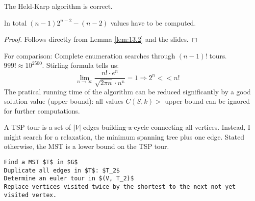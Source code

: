 \begin{thm}
The Held-Karp algorithm is correct.

In total $(n-1) 2^{n-2} - (n-2)$ values have to be computed.
\end{thm}
\begin{proof}
Follows directly from Lemma \ref{lem:13.2} and the slides.
\end{proof}

For comparison: Complete enumeration searches through $(n-1)!$ tours. $999! \approx 10^{2500}$.
Stirling formula tells us:
\[
\lim_{n \rightarrow \infty} \frac{n! \cdot e^n}{\sqrt{2 \pi n} \cdot n^n} = 1 \Rightarrow 2^n << n!
\]
The pratical running time of the algorithm can be reduced significantly by a good solution value (upper bound):
all values $C(S, k) >$ upper bound can be ignored for further computations.

A TSP tour is a set of $|V|$ edges \sout{building a cycle} connecting all vertices.
Instead, I might search for a relaxation, the minimum spanning tree plus one edge.
Stated otherwise, the MST is a lower bound on the TSP tour.

\begin{lstlisting}[caption=The MST heuristic is therefore]
Find a MST $T$ in $G$
Duplicate all edges in $T$: $T_2$
Determine an euler tour in $(V, T_2)$
Replace vertices visited twice by the shortest to the next not yet visited vertex.
\end{lstlisting}

